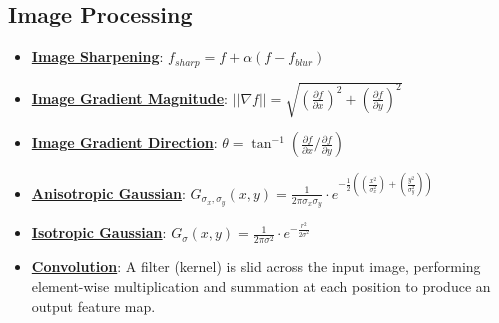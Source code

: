 \documentclass{article}%
\begin{document}
\subsection{Image Processing}%
\label{subsec:ImageProcessing}%
\begin{itemize}[leftmargin=*]%
\item \href{https://purdue.brightspace.com/d2l/common/assets/pdfjs-d2l-dist/1.0.14-legacy/web/viewer.html?file=\%2Fcontent\%2Fenforced\%2F1095467-wl.202510.CS.24300.001\%2F07L2-Vision.pdf\%3Fou\%3D1095467\&lang=en-us\&container=d2l-fileviewer-rendered-pdf\&fullscreen=d2l-fileviewer-rendered-pdf-dialog\&height=667#page=55}{\textbf{Image Sharpening}}: $f_{sharp} = f + \alpha(f − f_{blur})$%
\item \href{https://purdue.brightspace.com/d2l/common/assets/pdfjs-d2l-dist/1.0.14-legacy/web/viewer.html?file=\%2Fcontent\%2Fenforced\%2F1095467-wl.202510.CS.24300.001\%2F08L2-Feature Extraction.pdf\%3Fou\%3D1095467\&lang=en-us\&container=d2l-fileviewer-rendered-pdf\&fullscreen=d2l-fileviewer-rendered-pdf-dialog\&height=667#page=17}{\textbf{Image Gradient Magnitude}}: $||\nabla f|| = \sqrt{(\frac{\partial f}{\partial x})^2 + (\frac{\partial f}{\partial y})^2}$%
\item \href{https://purdue.brightspace.com/d2l/common/assets/pdfjs-d2l-dist/1.0.14-legacy/web/viewer.html?file=\%2Fcontent\%2Fenforced\%2F1095467-wl.202510.CS.24300.001\%2F08L2-Feature Extraction.pdf\%3Fou\%3D1095467\&lang=en-us\&container=d2l-fileviewer-rendered-pdf\&fullscreen=d2l-fileviewer-rendered-pdf-dialog\&height=667#page=34}{\textbf{Image Gradient Direction}}: $\theta = \tan^{-1}(\frac{\partial f}{\partial x} / \frac{\partial f}{\partial y})$%
\item \href{https://purdue.brightspace.com/d2l/common/assets/pdfjs-d2l-dist/1.0.14-legacy/web/viewer.html?file=\%2Fcontent\%2Fenforced\%2F1095467-wl.202510.CS.24300.001\%2F08L2-Feature Extraction.pdf\%3Fou\%3D1095467\&lang=en-us\&container=d2l-fileviewer-rendered-pdf\&fullscreen=d2l-fileviewer-rendered-pdf-dialog\&height=667#page=43}{\textbf{Anisotropic Gaussian}}: $G_{\sigma_x, \sigma_y}(x, y) = \frac{1}{2\pi\sigma_x\sigma_y} \cdot e^{-\frac{1}{2}((\frac{x^2}{\sigma_x^2}) + (\frac{y^2}{\sigma_y^2}))}$%
\item \href{https://purdue.brightspace.com/d2l/common/assets/pdfjs-d2l-dist/1.0.14-legacy/web/viewer.html?file=\%2Fcontent\%2Fenforced\%2F1095467-wl.202510.CS.24300.001\%2F08L2-Feature Extraction.pdf\%3Fou\%3D1095467\&lang=en-us\&container=d2l-fileviewer-rendered-pdf\&fullscreen=d2l-fileviewer-rendered-pdf-dialog\&height=667#page=43}{\textbf{Isotropic Gaussian}}: $G_\sigma(x, y) = \frac{1}{2\pi\sigma^2} \cdot e^{-\frac{r^2}{2\sigma^2}}$%
\item \href{https://purdue.brightspace.com/d2l/common/assets/pdfjs-d2l-dist/1.0.14-legacy/web/viewer.html?file=\%2Fcontent\%2Fenforced\%2F1095467-wl.202510.CS.24300.001\%2F09L1-cnn.pdf\%3Fou\%3D1095467\&lang=en-us\&container=d2l-fileviewer-rendered-pdf\&fullscreen=d2l-fileviewer-rendered-pdf-dialog\&height=667#page=6}{\textbf{Convolution}}: A filter (kernel) is slid across the input image, performing element-wise multiplication and summation at each position to produce an output feature map.%
\end{itemize}
\end{document}
